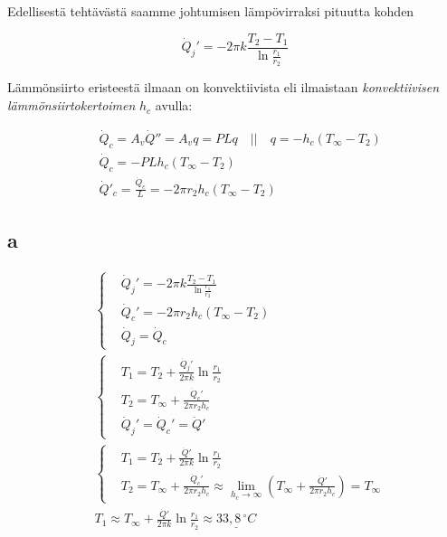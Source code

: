 \documentclass[12pt,a4paper,finnish]{article}
\begin{document}
Edellisestä tehtävästä saamme johtumisen lämpövirraksi pituutta kohden

\begin{equation}
  \dot{Q}_j' = -2\pi k\frac{T_2 - T_1}{\ln \frac{r_1}{r_2}}
\end{equation}

Lämmönsiirto eristeestä ilmaan on konvektiivista eli ilmaistaan \textit{konvektiivisen lämmönsiirtokertoimen} 
$h_c$ avulla:

\begin{align}
 &\dot{Q}_c = A_v\dot{Q}'' = A_vq = PLq \quad \bigg|\bigg| \quad q = -h_c(T_{\infty} - T_2)\\
 &\dot{Q}_c = -PLh_c(T_{\infty} - T_2)\\
 &\dot{Q}'_c = \frac{\dot{Q}_c}{L} = -2\pi r_2 h_c(T_{\infty} - T_2)
\end{align}

\subsection{a}

\begin{align}
 &\left\{
 \begin{aligned}
  &\dot{Q}_j' = -2\pi k\frac{T_2 - T_1}{\ln \frac{r_1}{r_2}}\\
  &\dot{Q}_c' = -2\pi r_2 h_c(T_{\infty} - T_2)\\
  &\dot{Q}_j = \dot{Q}_c
 \end{aligned}\right.\\
 &\left\{
 \begin{aligned}
  &T_1 = T_2 + \frac{\dot{Q}_j'}{2\pi k}\ln \frac{r_1}{r_2}\\
  &T_2 = T_{\infty} + \frac{\dot{Q}_c'}{2\pi r_2 h_c}\\
  &\dot{Q}_j' = \dot{Q}_c' = \dot{Q}'
 \end{aligned}\right.\\
 &\left\{
 \begin{aligned}
  &T_1 = T_2 + \frac{\dot{Q}'}{2\pi k}\ln \frac{r_1}{r_2}\\
  &T_2 = T_{\infty} + \frac{\dot{Q}_c'}{2\pi r_2 h_c} 
   \approx \lim_{h_c \to \infty}\left( T_{\infty} + \frac{\dot{Q}'}{2\pi r_2 h_c}\right) = T_{\infty}
 \end{aligned}\right.\\
  &T_1 \approx T_{\infty} + \frac{\dot{Q}'}{2\pi k}\ln \frac{r_1}{r_2} \approx \underline{33,8\,^{\circ}C}
\end{align}
\end{document}
